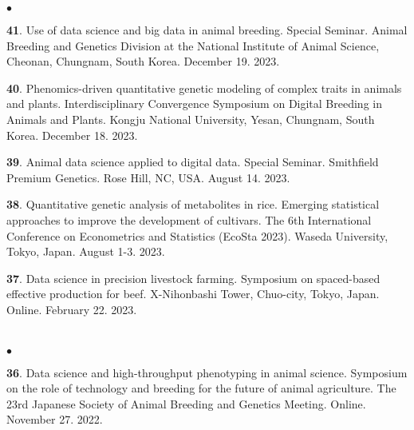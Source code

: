 \documentclass[margin,line,10pt]{res}
\newenvironment{list2}{
  \begin{list}{$\bullet$}{%
      \setlength{\itemsep}{0in}
      \setlength{\parsep}{0in} \setlength{\parskip}{0in}
      \setlength{\topsep}{0in} \setlength{\partopsep}{0in} 
      \setlength{\leftmargin}{0.2in}}}{\end{list}}
\begin{document}
\begin{resume}
\begin{list2}
  \item [{\bf 41}.] Use of data science and big data in animal breeding. Special Seminar. Animal Breeding and Genetics Division at the National Institute of Animal Science, Cheonan, Chungnam, South Korea. December 19. 2023. 

  \vspace{0.5cm}

  \item [{\bf 40}.] Phenomics-driven quantitative genetic modeling of complex traits in animals and plants. Interdisciplinary Convergence Symposium on Digital Breeding in Animals and Plants. Kongju National University, Yesan, Chungnam, South Korea. December 18. 2023. 

  \vspace{0.5cm}

  \item [{\bf 39}.] Animal data science applied to digital data. Special Seminar. Smithfield Premium Genetics. Rose Hill, NC, USA. August 14. 2023. 

  \vspace{0.5cm}

  \item [{\bf 38}.] Quantitative genetic analysis of metabolites in rice. Emerging statistical approaches to improve the development of cultivars. The 6th International Conference on Econometrics and Statistics (EcoSta 2023). Waseda University, Tokyo, Japan. August 1-3. 2023.

  \vspace{0.5cm}

  \item [{\bf 37}.] Data science in precision livestock farming. Symposium on spaced-based effective production for beef. X-Nihonbashi Tower, Chuo-city, Tokyo, Japan. Online. February 22. 2023.

\end{list2}



\section{}
\begin{list2}
  

\item [{\bf 36}.] Data science and high-throughput phenotyping in animal science. Symposium on the role of technology and breeding for the future of animal agriculture. The 23rd Japanese Society of Animal Breeding and Genetics Meeting. Online. November 27. 2022. 


\end{list2}
\end{resume}
\end{document}

